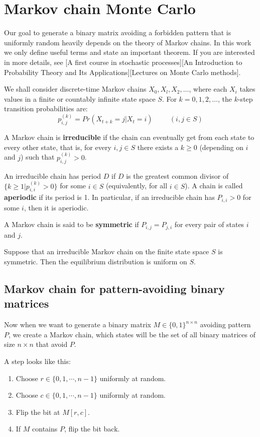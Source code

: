 \chapter{Markov chain Monte Carlo}
Our goal to generate a binary matrix avoiding a forbidden pattern that is uniformly random heavily depends on the theory of Markov chains. In this work we only define useful terms and state an important theorem. If you are interested in more details, see [A first course in stochastic processes][An Introduction to Probability Theory and Its Applications][Lectures on Monte Carlo methods].

We shall consider discrete-time Markov chains $X_0,X_l,X_2,\dots$, where each $X_i$ takes values in a finite or countably infinite state space $S$. For $k=0,1,2,\dots$, the $k$-step transition probabilities are:
$$p_{i,j}^{(k)}=Pr(X_{t+k}=j|X_t=i) \hspace{1cm} (i,j\in S)$$

A Markov chain is \textbf{irreducible} if the chain can eventually get from each state to every other state, that is, for every $i,j\in S$ there exists a $k\geq0$ (depending on $i$ and $j$) such that $p_{i,j}^{(k)}>0$.

An irreducible chain has period $D$ if $D$ is the greatest common divisor of $\{k\geq1|p_{i,i}^{(k)}>0\}$ for some $i\in S$ (equivalently, for all $i\in S$). A chain is called \textbf{aperiodic} if its period is 1. In particular, if an irreducible chain has $P_{i,i}>0$ for some $i$, then it is aperiodic.

A Markov chain is said to be \textbf{symmetric} if $P_{i,j}=P_{j,i}$ for every pair of states $i$ and $j$.

Suppose that an irreducible Markov chain on the finite state
space $S$ is symmetric. Then the equilibrium distribution is uniform on $S$.

\section{Markov chain for pattern-avoiding binary matrices}
Now when we want to generate a binary matrix $M\in\{0,1\}^{n\times n}$ avoiding pattern $P$, we create a Markov chain, which states will be the set of all binary matrices of size $n\times n$ that avoid $P$.

A step looks like this:
\begin{enumerate}
\item Choose $r\in\{0,1,\cdots,n-1\}$ uniformly at random.
\item Choose $c\in\{0,1,\cdots,n-1\}$ uniformly at random.
\item Flip the bit at $M[r,c]$.
\item If $M$ contains $P$, flip the bit back.
\end{enumerate}


